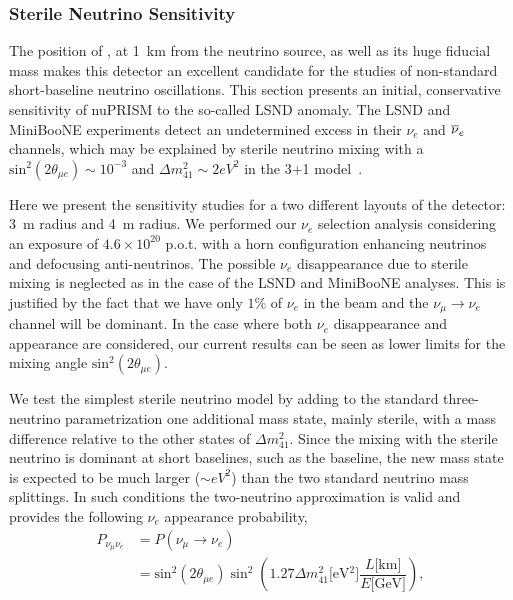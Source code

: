 \subsubsection{Sterile Neutrino Sensitivity}

\def\stme       {\ensuremath{\textrm{sin}^2(2\theta_{\mu e})}\xspace}
\def\dmsqfo     {\ensuremath{\Delta m^{2}_{41}\xspace}}
\def\nue        {\ensuremath{\nu_e}\xspace}
\def\nueb       {\ensuremath{\nub_e}\xspace}
\def\nuenueb    {\ensuremath{\nue\nueb}\xspace}
\def\numu        {\ensuremath{\nu_\mu}\xspace}
\def\numub       {\ensuremath{\nub_\mu}\xspace}


The position of \nuprismlite, at 1~km from the neutrino source, as well as its huge fiducial mass makes this detector an excellent candidate for the studies of non-standard 
short-baseline neutrino oscillations. This section presents an initial, conservative sensitivity of nuPRISM to the so-called LSND anomaly. The LSND and MiniBooNE experiments detect an undetermined excess in their \nue and \nueb channels, which may be explained by sterile neutrino mixing with a 
$\stme \sim 10^{-3}$ and $ \dmsqfo \sim 2eV^2$ in the 3+1 model~\cite{miniboone-nue}. %

Here we present the sensitivity studies for a two different layouts of the \nuprism detector: 3~m radius and 4~m 
radius. We performed our $\nue$ selection analysis considering an exposure of $4.6\times 10^{20}$ 
p.o.t. with a horn configuration enhancing neutrinos and defocusing anti-neutrinos. The possible $\nue$ disappearance due to sterile mixing is neglected as in 
the case of the LSND and MiniBooNE analyses. This is justified by the fact that we have only $1\%$ 
of $\nue$ in the beam and the $\numu \rightarrow \nue$ channel will be dominant. In the case where both 
$\nue$ disappearance and appearance are considered, our current results can be seen as 
lower limits for the mixing angle $\stme$.

We test the simplest sterile neutrino model by adding to the standard three-neutrino parametrization one additional mass state, mainly sterile, with a mass difference relative to the other states of $\Delta m^2_{41}$. 
Since the mixing with the sterile neutrino is dominant at short baselines, such as the \nuprismlite baseline, the new mass state is expected to be much larger ($\sim eV^2$) than the two standard neutrino mass splittings. In such conditions the two-neutrino approximation is valid and provides the following \nue
appearance probability,
\begin{equation}
\begin{split}
 P_{\numu\nue} & = P(\numu \rightarrow \nue) \\
 & = \stme\sin^2\left( 1.27 
\dmsqfo\mbox{[eV$^2$]}\dfrac{L\mbox{[km]}}{E\mbox{[GeV]}}\right),
\end{split}
\label{eq:app}
\end{equation}

